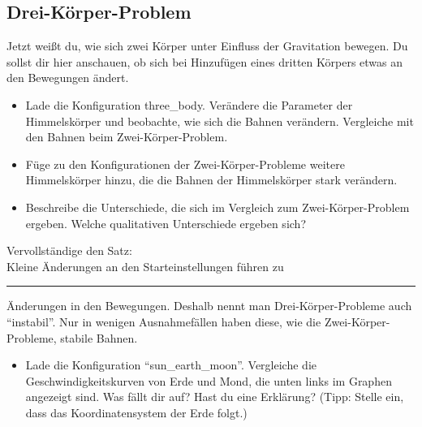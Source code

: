 \documentclass{scrartcl}
\begin{document}
        \subsection*{Drei-Körper-Problem}
        Jetzt weißt du, wie sich zwei Körper unter Einfluss der Gravitation bewegen. Du sollst dir hier anschauen, ob sich bei Hinzufügen eines dritten Körpers etwas an den Bewegungen ändert.
        \begin{itemize}
            \item Lade die Konfiguration \glqq three\_body\grqq{}. Verändere die Parameter der Himmelskörper und beobachte, wie sich die Bahnen verändern. Vergleiche mit den Bahnen beim Zwei-Körper-Problem.
            \item Füge zu den Konfigurationen der Zwei-Körper-Probleme weitere Himmelskörper hinzu, die die Bahnen der Himmelskörper stark verändern. 
            \item Beschreibe die Unterschiede, die sich im Vergleich zum Zwei-Körper-Problem ergeben. Welche qualitativen Unterschiede ergeben sich?
        \end{itemize}

        \noindent Vervollständige den Satz:\\
        \noindent Kleine Änderungen an den Starteinstellungen führen zu \rule{3cm}{0.4pt} Änderungen in den Bewegungen.
        Deshalb nennt man Drei-Körper-Probleme auch "`instabil"'. Nur in wenigen Ausnahmefällen haben diese, wie die Zwei-Körper-Probleme, stabile Bahnen.

        \begin{itemize}
            \item Lade die Konfiguration "`sun\_earth\_moon"'. Vergleiche die Geschwindigkeitskurven von Erde und Mond, die unten links im Graphen angezeigt sind. Was fällt dir auf? Hast du eine Erklärung?
            (Tipp: Stelle ein, dass das Koordinatensystem der Erde folgt.)
        \end{itemize}

        \newpage
\end{document}
